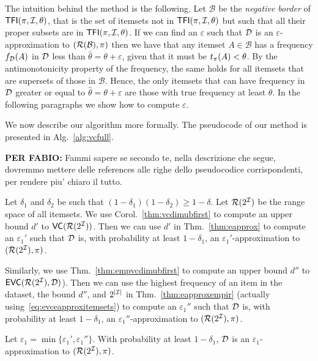The intuition behind the method is the following.
Let $\mathcal{B}$ be
the \emph{negative border} of $\mathsf{TFI}(\pi,{\cal I},\theta)$, that is the set of itemsets
not in $\mathsf{TFI}(\pi,{\cal I},\theta)$ but such that all their proper subsets are in
$\mathsf{TFI}(\pi,{\cal I},\theta)$. If we can find an $\varepsilon$ such that ${\cal D}$ is an
$\varepsilon$-approximation to $(\mathcal{R}(\mathcal{B}),\pi)$ then
we have that any itemset
$A\in\mathcal{B}$ has a frequency $f_{\cal D}(A)$ in ${\cal D}$ less than
$\hat{\theta}=\theta+\varepsilon$, given that it must be $t_\pi(A)<\theta$. By the
antimonotonicity property of the frequency, the same holds for all itemsets that
are supersets of those in $\mathcal{B}$. Hence, the only itemsets that can have
frequency in ${\cal D}$ greater or equal to $\hat{\theta}=\theta+\varepsilon$ are
those with true frequency at least $\theta$. In the following paragraphs we show
how to compute $\varepsilon$.

We now describe our algorithm more formally. The pseudocode of our method is
presented in Alg.~\ref{alg:vcfull}.

{\bf PER FABIO: } Fammi sapere se secondo te, nella descrizione che segue,
dovremmo mettere delle references alle righe dello pseudocodice corrispondenti,
per rendere piu' chiaro il tutto.

Let $\delta_1$ and $\delta_2$ be such that $(1-\delta_1)(1-\delta_2)\ge
1-\delta$. Let $\mathcal{R}(2^{\cal I})$ be the range space of all itemsets.
We use Corol.~\ref{thm:vcdimubfirst} to
compute an upper bound $d'$ to $\mathsf{VC}(\mathcal{R}(2^{\cal I}))$. Then we can use $d'$ in
Thm.~\ref{thm:eapprox} to compute an $\varepsilon_1'$ such that ${\cal D}$ is, with
probability at least $1-\delta_1$, an $\varepsilon_1'$-approximation to
$(\mathcal{R}(2^{\cal I}),\pi)$.

Similarly, we use Thm.~\ref{thm:empvcdimubfirst} to compute an upper bound $d''$ to
$\mathsf{EVC}(\mathcal{R}(2^{\cal I}),{\cal D})$). Then we can use the highest frequency of an item in the
dataset, the bound $d''$, and $2^{|{\cal I}|}$ in Thm.~\ref{thm:eapproxempir} (actually
using~\eqref{eq:evceapproxitemsets}) to compute an $\varepsilon_1''$ such that
${\cal D}$ is, with probability at least $1-\delta_1$, an
$\varepsilon_1''$-approximation to $(\mathcal{R}(2^{\cal I}),\pi)$.

\begin{fact}
Let
$\varepsilon_1=\min\{\varepsilon_1',\varepsilon_1''\}$. With probability at
least $1-\delta_1$, ${\cal D}$ is an $\varepsilon_1$-approximation to
$(\mathcal{R}(2^{\cal I}),\pi)$.
\end{fact}

